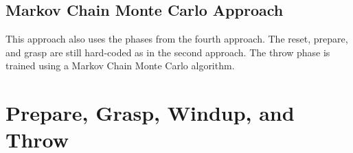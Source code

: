 \documentclass[10pt,twocolumn,letterpaper]{article}
\begin{document}
\subsection{Markov Chain Monte Carlo Approach} \label{subsec:MCMC}

This approach also uses the phases from the fourth approach. The reset, prepare, and grasp are still hard-coded as in the second approach. The throw phase is trained using a Markov Chain Monte Carlo algorithm. 


\section{Prepare, Grasp, Windup, and Throw} \label{sec:Windup}

{\small


}
\end{document}
